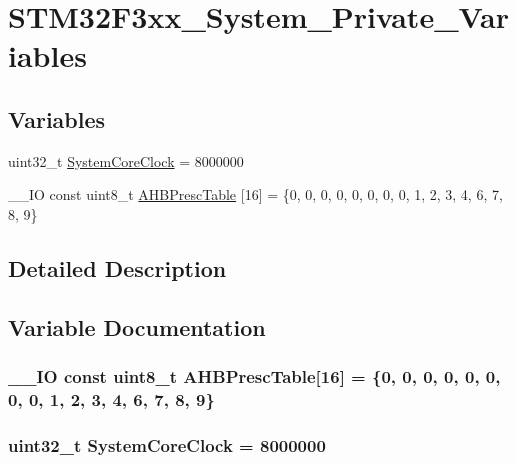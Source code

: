 \hypertarget{group___s_t_m32_f3xx___system___private___variables}{}\section{S\+T\+M32\+F3xx\+\_\+\+System\+\_\+\+Private\+\_\+\+Variables}
\label{group___s_t_m32_f3xx___system___private___variables}
\subsection*{Variables}
\begin{DoxyCompactItemize}
\item 
uint32\+\_\+t \hyperlink{group___s_t_m32_f3xx___system___private___variables_gaa3cd3e43291e81e795d642b79b6088e6}{System\+Core\+Clock} = 8000000
\item 
\+\_\+\+\_\+\+I\+O const uint8\+\_\+t \hyperlink{group___s_t_m32_f3xx___system___private___variables_ga6f9c3580a063d25bfc3acae1db341b12}{A\+H\+B\+Presc\+Table} \mbox{[}16\mbox{]} = \{0, 0, 0, 0, 0, 0, 0, 0, 1, 2, 3, 4, 6, 7, 8, 9\}
\end{DoxyCompactItemize}


\subsection{Detailed Description}


\subsection{Variable Documentation}
\hypertarget{group___s_t_m32_f3xx___system___private___variables_ga6f9c3580a063d25bfc3acae1db341b12}{}
\subsubsection[{A\+H\+B\+Presc\+Table}]{\setlength{\rightskip}{0pt plus 5cm}\+\_\+\+\_\+\+I\+O const uint8\+\_\+t A\+H\+B\+Presc\+Table\mbox{[}16\mbox{]} = \{0, 0, 0, 0, 0, 0, 0, 0, 1, 2, 3, 4, 6, 7, 8, 9\}}\label{group___s_t_m32_f3xx___system___private___variables_ga6f9c3580a063d25bfc3acae1db341b12}
\hypertarget{group___s_t_m32_f3xx___system___private___variables_gaa3cd3e43291e81e795d642b79b6088e6}{}
\subsubsection[{System\+Core\+Clock}]{\setlength{\rightskip}{0pt plus 5cm}uint32\+\_\+t System\+Core\+Clock = 8000000}\label{group___s_t_m32_f3xx___system___private___variables_gaa3cd3e43291e81e795d642b79b6088e6}
